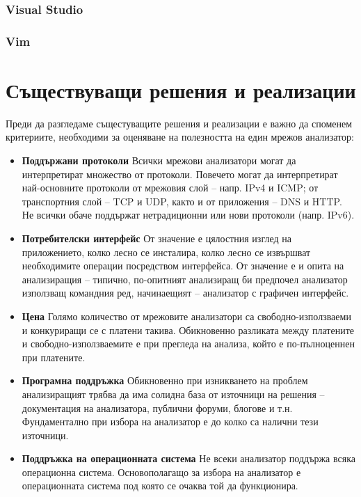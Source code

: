 \documentclass[12pt,a4paper,oneside]{book}
\begin{document}
\subsubsection{Visual Studio}

\subsubsection{Vim}

\section{Съществуващи решения и реализации}

Преди да разгледаме същестуващите решения и реализации е важно да споменем
критериите, необходими за оценяване на полезността на един мрежов анализатор:

\begin{itemize}
  \item \textbf{Поддържани протоколи} Всички мрежови анализатори могат да
    интерпретират множество от протоколи. Повечето могат да интерпретират
    най-основните протоколи от мрежовия слой -- напр. IPv4 и ICMP; от
    транспортния слой -- TCP и UDP, както и от приложения -- DNS и HTTP.
    Не всички обаче поддържат нетрадиционни или нови протоколи (напр. IPv6).
  \item \textbf{Потребителски интерфейс} От значение е цялостния изглед на
    приложението, колко лесно се инсталира, колко лесно се извършват
    необходимите операции посредством интерфейса. От значение е и опита на
    анализиращия -- типично, по-опитният анализиращ би предпочел анализатор
    използващ командния ред, начинаещият -- анализатор с графичен интерфейс.
  \item \textbf{Цена} Голямо количество от мрежовите анализатори са
    свободно-използваеми и конкуриращи се с платени такива. Обикновенно
    разликата между платените и свободно-използваемите е при прегледа на
    анализа, който е по-пълноценнен при платените.
  \item \textbf{Програмна поддръжка} Обикновенно при изникването на проблем
    анализиращият трябва да има солидна база от източници на решения --
    документация на анализатора, публични форуми, блогове и т.н. Фундаментално
    при избора на анализатор е до колко са налични тези източници.
  \item \textbf{Поддръжка на операционната система} Не всеки анализатор поддържа
    всяка операционна система. Основополагащо за избора на анализатор е
    операционната система под която се очаква той да функционира.
\end{itemize}
\end{document}
